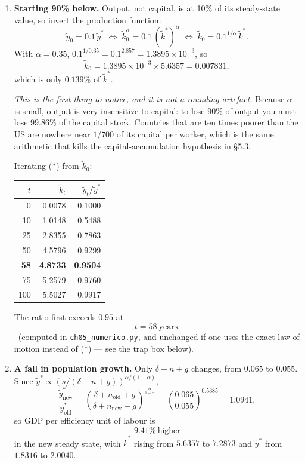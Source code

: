 \documentclass[12pt, letterpaper]{article}
\newcommand{\stst}{^{\ast}}
\begin{document}
\begin{tcolorbox}[oddbox,title={Problem 5.1 \quad Quantifying the Solow Model}]
\begin{enumerate}
\item \textbf{Starting 90\% below.} Output, not capital, is at 10\% of its steady-state
value, so invert the production function:
\[
\tilde y_0=0.1\,\tilde y\stst
\;\Longleftrightarrow\;
\tilde k_0^{\alpha}=0.1\,(\tilde k\stst)^{\alpha}
\;\Longleftrightarrow\;
\tilde k_0=0.1^{1/\alpha}\,\tilde k\stst .
\]
With $\alpha=0.35$, $0.1^{1/0.35}=0.1^{2.857}=1.3895\times10^{-3}$, so
\[
\boxed{\tilde k_0=1.3895\times10^{-3}\times 5.6357=0.007831},
\]
which is only $0.139\%$ of $\tilde k\stst$.

\smallskip
\emph{This is the first thing to notice, and it is not a rounding artefact.} Because
$\alpha$ is small, output is very insensitive to capital: to lose 90\% of output you must
lose 99.86\% of the capital stock. Countries that are ten times poorer than the US are
nowhere near $1/700$ of its capital per worker, which is the same arithmetic that kills the
capital-accumulation hypothesis in \S5.3.

\smallskip
Iterating ($\ast$) from $\tilde k_0$:
\begin{center}
\begin{tabular}{@{}rrr@{}}
\toprule
$t$ & $\tilde k_t$ & $\tilde y_t/\tilde y\stst$ \\
\midrule
0   & 0.0078 & 0.1000 \\
10  & 1.0148 & 0.5488 \\
25  & 2.8355 & 0.7863 \\
50  & 4.5796 & 0.9299 \\
\textbf{58}  & \textbf{4.8733} & \textbf{0.9504} \\
75  & 5.2579 & 0.9760 \\
100 & 5.5027 & 0.9917 \\
\bottomrule
\end{tabular}
\end{center}
The ratio first exceeds $0.95$ at
\[
\boxed{t=58\ \text{years}} .
\]
\checkmark\ (computed in \texttt{ch05\_numerico.py}, and unchanged if one uses the exact law
of motion instead of ($\ast$) --- see the trap box below).

\item \textbf{A fall in population growth.} Only $\delta+n+g$ changes, from $0.065$ to
$0.055$. Since $\tilde y\stst\propto(s/(\delta+n+g))^{\alpha/(1-\alpha)}$,
\[
\frac{\tilde y\stst_{\text{new}}}{\tilde y\stst_{\text{old}}}
=\left(\frac{\delta+n_{\text{old}}+g}{\delta+n_{\text{new}}+g}\right)^{\frac{\alpha}{1-\alpha}}
=\left(\frac{0.065}{0.055}\right)^{0.5385}
=1.0941 ,
\]
so GDP per efficiency unit of labour is
\[
\boxed{9.41\%\ \text{higher}}
\]
in the new steady state, with $\tilde k\stst$ rising from $5.6357$ to $7.2873$ and
$\tilde y\stst$ from $1.8316$ to $2.0040$. \checkmark


\end{enumerate}
\end{tcolorbox}
\end{document}
